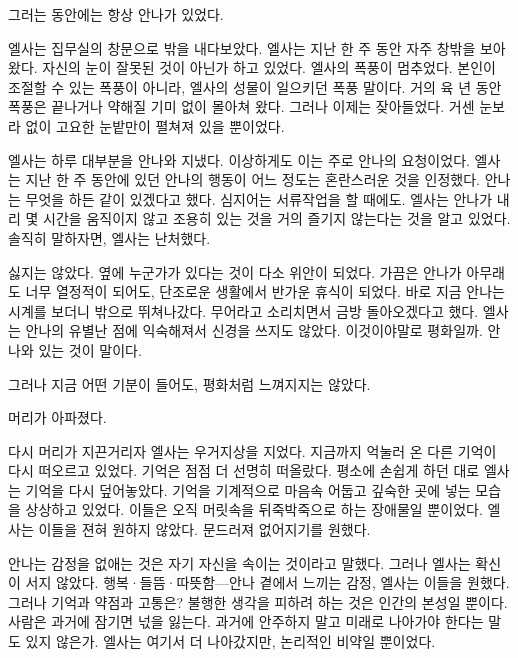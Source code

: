 그러는 동안에는 항상 안나가 있었다.

\textbreak

엘사는 집무실의 창문으로 밖을 내다보았다. 엘사는 지난 한 주 동안 자주 창밖을 보아왔다. 자신의 눈이 잘못된 것이 아닌가 하고 있었다. 엘사의 폭풍이 멈추었다. 본인이 조절할 수 있는 폭풍이 아니라, 엘사의 성물이 일으키던 폭풍 말이다. 거의 육 년 동안 폭풍은 끝나거나 약해질 기미 없이 몰아쳐 왔다. 그러나 이제는 잦아들었다. 거센 눈보라 없이 고요한 눈밭만이 펼쳐져 있을 뿐이었다.

엘사는 하루 대부분을 안나와 지냈다. 이상하게도 이는 주로 안나의 요청이었다. 엘사는 지난 한 주 동안에 있던 안나의 행동이 어느 정도는 혼란스러운 것을 인정했다. 안나는 무엇을 하든 같이 있겠다고 했다. 심지어는 서류작업을 할 때에도. 엘사는 안나가 내리 몇 시간을 움직이지 않고 조용히 있는 것을 거의 즐기지 않는다는 것을 알고 있었다. 솔직히 말하자면, 엘사는 난처했다.

싫지는 않았다. 옆에 누군가가 있다는 것이 다소 위안이 되었다. 가끔은 안나가 아무래도 너무 열정적이 되어도, 단조로운 생활에서 반가운 휴식이 되었다. 바로 지금 안나는 시계를 보더니 밖으로 뛰쳐나갔다. 무어라고 소리치면서 금방 돌아오겠다고 했다. 엘사는 안나의 유별난 점에 익숙해져서 신경을 쓰지도 않았다. 이것이야말로 평화일까. 안나와 있는 것이 말이다.

그러나 지금 어떤 기분이 들어도, 평화처럼 느껴지지는 않았다.

머리가 아파졌다.

다시 머리가 지끈거리자 엘사는 우거지상을 지었다. 지금까지 억눌러 온 다른 기억이 다시 떠오르고 있었다. 기억은 점점 더 선명히 떠올랐다. 평소에 손쉽게 하던 대로 엘사는 기억을 다시 덮어놓았다. 기억을 기계적으로 마음속 어둡고 깊숙한 곳에 넣는 모습을 상상하고 있었다. 이들은 오직 머릿속을 뒤죽박죽으로 하는 장애물일 뿐이었다. 엘사는 이들을 젼혀 원하지 않았다. 문드러져 없어지기를 원했다.

안나는 감정을 없애는 것은 자기 자신을 속이는 것이라고 말했다. 그러나 엘사는 확신이 서지 않았다. 행복·들뜸·따뜻함—안나 곁에서 느끼는 감정, 엘사는 이들을 원했다. 그러나 기억과 약점과 고통은? 불행한 생각을 피하려 하는 것은 인간의 본성일 뿐이다. 사람은 과거에 잠기면 넋을 잃는다. 과거에 안주하지 말고 미래로 나아가야 한다는 말도 있지 않은가. 엘사는 여기서 더 나아갔지만, 논리적인 비약일 뿐이었다.

